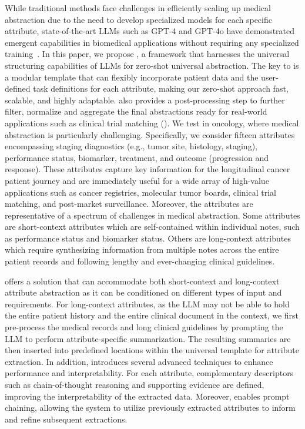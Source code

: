 While traditional methods face challenges in efficiently scaling up medical abstraction due to the need to develop specialized models for each specific attribute,  state-of-the-art \acp{LLM} such as GPT-4 and GPT-4o have demonstrated emergent capabilities in biomedical applications without requiring any specialized training~\cite{lee2023benefits, nori2023can}. 
In this paper, we propose \oursfull, a framework that harnesses the universal structuring capabilities of \acp{LLM} for zero-shot universal abstraction. The key to \ours is a modular template that can flexibly incorporate patient data and the user-defined task definitions for each attribute, making our zero-shot approach fast, scalable, and highly adaptable. \ours also provides a post-processing step to further filter, normalize and aggregate the final abstractions ready for real-world applications such as clinical trial matching (). 
We test \ours in oncology, where medical abstraction is particularly challenging. Specifically, we consider fifteen attributes encompassing staging diagnostics (e.g., tumor site, histology, staging), performance status, biomarker, treatment, and outcome (progression and response). 
These attributes capture key information for the longitudinal cancer patient journey and are immediately useful for a wide array of high-value applications such as cancer registries, molecular tumor boards, clinical trial matching, and post-market surveillance.
Moreover, the attributes are representative of a  spectrum of challenges in medical abstraction. Some attributes are short-context attributes which are self-contained within individual notes, such as performance status and biomarker status. Others are long-context attributes which require synthesizing information from multiple notes across the entire patient records and following lengthy and ever-changing clinical guidelines.

\ours offers a solution that can accommodate both short-context and long-context attribute abstraction as it can be conditioned on different types of input and requirements.
For long-context attributes, as the \ac{LLM} may not be able to hold the entire patient history and the entire clinical document in the context, we first pre-process the medical records and long clinical guidelines by prompting the \ac{LLM} to perform attribute-specific summarization. The resulting summaries are then inserted into predefined locations within the universal template for attribute extraction. In addition, \ours introduces several advanced techniques to enhance performance and interpretability. For each attribute, complementary descriptors such as chain-of-thought reasoning and supporting evidence are defined, improving the interpretability of the extracted data. Moreover, \ours enables prompt chaining, allowing the system to utilize previously extracted attributes to inform and refine subsequent extractions. 




